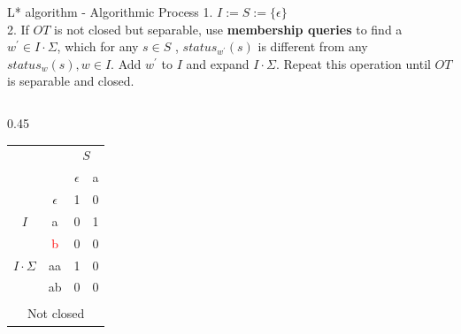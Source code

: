 \documentclass{beamer}
\begin{document}
\begin{frame}{L* algorithm - Algorithmic Process}
    1. $I:= S := \{\epsilon\}$\\
    2. If $OT$ is not closed but separable, use \textbf{membership queries} to find a $w^{\prime} \in I \cdot \Sigma$, which for any $s\in S$ , $status_{w^{\prime}}(s)$ is different from any $status_{w}(s),w \in I$. Add $w^{\prime}$ to $I$ and expand $I \cdot \Sigma$. Repeat this operation until $OT$ is separable and closed.\\
    
    \begin{columns}[T]
        \begin{column}{0.45\textwidth} 
            \centering
            \begin{tabular}{cc|c|c}
                &   & \multicolumn{2}{c}{$S$} \\ 
                \multicolumn{2}{c|}{} & $\epsilon$ & a \\ \hline
                & $\epsilon$ & 1 & 0 \\
                {$I$}& a          & 0 & 1 \\ \hline
                 & \textcolor{red}{b}          & 0 & 0 \\
                {$I \cdot \Sigma$}           & aa& 1& 0 \\
                & ab& 0&0\\ 
                \multicolumn{4}{c}{} \\[-0.8em] 
                \multicolumn{4}{c}{\footnotesize Not closed}
            \end{tabular}
        \end{column}
    

\end{columns}
\end{frame}
\end{document}
